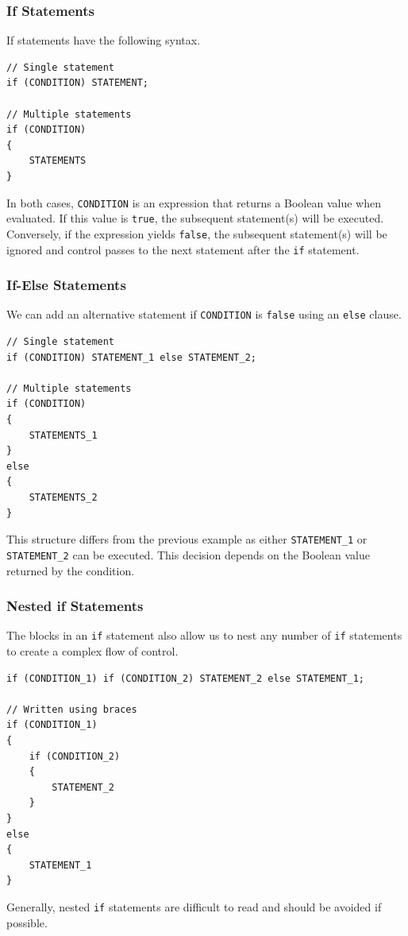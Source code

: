 \documentclass{article}
\begin{document}
\subsubsection{If Statements}
If statements have the following syntax.
\begin{verbatim}
// Single statement
if (CONDITION) STATEMENT;

// Multiple statements
if (CONDITION)
{
    STATEMENTS
}
\end{verbatim}
In both cases, \texttt{CONDITION} is an expression that
returns a Boolean value when evaluated. If this value is
\texttt{true}, the subsequent statement(s) will be
executed. Conversely, if the expression yields
\texttt{false}, the subsequent statement(s) will be ignored
and control passes to the next statement after the
\texttt{if} statement.
\subsubsection{If-Else Statements}
We can add an alternative statement if \texttt{CONDITION}
is \texttt{false} using an \texttt{else}
clause.
\begin{verbatim}
// Single statement
if (CONDITION) STATEMENT_1 else STATEMENT_2;

// Multiple statements
if (CONDITION)
{
    STATEMENTS_1
}
else
{
    STATEMENTS_2
}
\end{verbatim}
This structure differs from the previous example as either
\texttt{STATEMENT_1} or \texttt{STATEMENT_2}
can be executed. This decision depends on the Boolean value returned by
the condition.
\subsubsection{Nested if Statements}
The blocks in an \texttt{if} statement also allow us to
nest any number of \texttt{if} statements to create a
complex flow of control.
\begin{verbatim}
if (CONDITION_1) if (CONDITION_2) STATEMENT_2 else STATEMENT_1;

// Written using braces
if (CONDITION_1)
{
    if (CONDITION_2)
    {
        STATEMENT_2
    }
}
else
{
    STATEMENT_1
}
\end{verbatim}
Generally, nested \texttt{if} statements are difficult to
read and should be avoided if possible.
\end{document}
